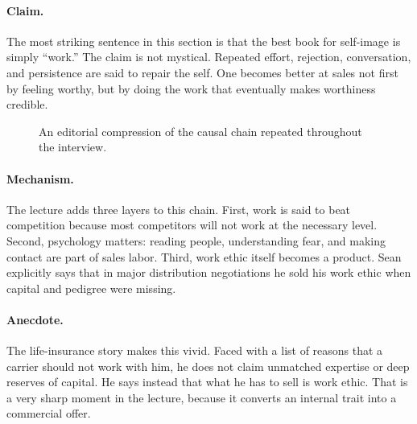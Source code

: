 \paragraph{Claim.}
The most striking sentence in this section is that the best book for self-image is simply ``work.'' The claim is not mystical. Repeated effort, rejection, conversation, and persistence are said to repair the self. One becomes better at sales not first by feeling worthy, but by doing the work that eventually makes worthiness credible.

\begin{figure}[h]
\centering
{}
\caption{An editorial compression of the causal chain repeated throughout the interview.}
\end{figure}

\paragraph{Mechanism.}
The lecture adds three layers to this chain. First, work is said to beat competition because most competitors will not work at the necessary level. Second, psychology matters: reading people, understanding fear, and making contact are part of sales labor. Third, work ethic itself becomes a product. Sean explicitly says that in major distribution negotiations he sold his work ethic when capital and pedigree were missing.

\paragraph{Anecdote.}
The life-insurance story makes this vivid. Faced with a list of reasons that a carrier should not work with him, he does not claim unmatched expertise or deep reserves of capital. He says instead that what he has to sell is work ethic. That is a very sharp moment in the lecture, because it converts an internal trait into a commercial offer.

